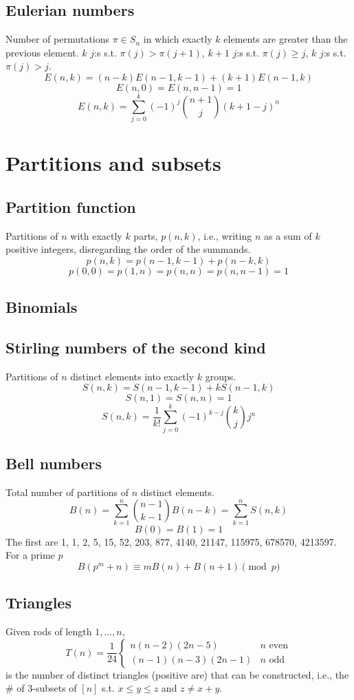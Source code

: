 	\subsection{Eulerian numbers}
		Number of permutations $\pi \in S_n$ in which exactly $k$ elements are greater than the previous element. $k$ $j$:s s.t. $\pi(j)>\pi(j+1)$, $k+1$ $j$:s s.t. $\pi(j)\geq j$, $k$ $j$:s s.t. $\pi(j)>j$.
		$$E(n,k) = (n-k)E(n-1,k-1) + (k+1)E(n-1,k)$$
		$$E(n,0) = E(n,n-1) = 1$$
		$$E(n,k) = \sum_{j=0}^k(-1)^j\binom{n+1}{j}(k+1-j)^n$$

\section{Partitions and subsets}
	\subsection{Partition function}
		Partitions of $n$ with exactly $k$ parts, $p(n,k)$, i.e., writing $n$ as a sum of $k$ positive integers, disregarding the order of the summands.
		$$p(n,k) = p(n-1,k-1)+p(n-k,k)$$
		$$p(0,0)=p(1,n)=p(n,n)=p(n,n-1)=1$$

	\columnbreak

	\subsection{Binomials}

	\subsection{Stirling numbers of the second kind}
		Partitions of $n$ distinct elements into exactly $k$ groups.
		$$S(n,k) = S(n-1,k-1) + k S(n-1,k)$$
		$$S(n,1) = S(n,n) = 1$$
		$$S(n,k) = \frac{1}{k!}\sum_{j=0}^k (-1)^{k-j}\binom{k}{j}j^n$$

	\subsection{Bell numbers}
		Total number of partitions of $n$ distinct elements.
		$$B(n) = \sum_{k=1}^n \binom{n-1}{k-1}B(n-k) = \sum_{k=1}^n S(n,k)$$
		$$B(0) = B(1) = 1$$
		The first are 1, 1, 2, 5, 15, 52, 203, 877, 4140, 21147, 115975, 678570, 4213597.
		For a prime $p$
		$$B(p^m+n)\equiv mB(n)+B(n+1) \pmod{p}$$

	\subsection{Triangles}
		Given rods of length $1,\ldots,n$,
		$$T(n) = \frac{1}{24} \left\{\begin{array}{ll}n(n-2)(2n-5) & n \text{ even}\\(n-1)(n-3)(2n-1) & n \text{ odd}\end{array}\right.$$
		is the number of distinct triangles (positive are) that can be constructed, i.e., the \# of 3-subsets of $[n]$ s.t. $x\leq y\leq z$ and $z\neq x+y$.

